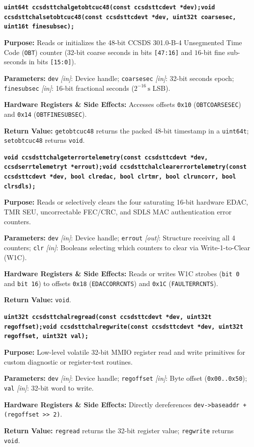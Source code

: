 \documentclass[10pt,a4paper]{article}
\renewcommand{\_}{\origunderscore\penalty0\hskip0pt\relax}
\newcommand{\apifunc}[5]{%
  \par\vspace{5pt}\noindent\colorbox{codebg}{%
    \parbox{\dimexpr\textwidth-2\fboxsep\relax}{%
      \vspace{3pt}\texttt{\bfseries\color{navy}#1}\vspace{3pt}%
    }%
  }\par\nopagebreak\vspace{2pt}%
  \noindent\textbf{Purpose:} #2\par\nopagebreak
  \noindent\textbf{Parameters:} #3\par\nopagebreak
  \noindent\textbf{Hardware Registers \& Side Effects:} #4\par\nopagebreak
  \noindent\textbf{Return Value:} #5\par\vspace{3pt}%
}
\numberwithin{table}{section}
\numberwithin{figure}{section}
\numberwithin{equation}{section}
\begin{document}
\apifunc{uint64\_t ccsds\_ttc\_hal\_get\_obt\_cuc48(const ccsds\_ttc\_dev\_t *dev);\newline void ccsds\_ttc\_hal\_set\_obt\_cuc48(const ccsds\_ttc\_dev\_t *dev, uint32\_t coarse\_sec, uint16\_t fine\_subsec);}%
{Reads or initializes the 48-bit CCSDS 301.0-B-4 Unsegmented Time Code (\texttt{OBT}) counter ($32$-bit coarse seconds in bits \texttt{[47:16]} and $16$-bit fine sub-seconds in bits \texttt{[15:0]}).}%
{\texttt{dev} \emph{[in]}: Device handle; \texttt{coarse\_sec} \emph{[in]}: 32-bit seconds epoch; \texttt{fine\_subsec} \emph{[in]}: 16-bit fractional seconds ($2^{-16}\,\text{s}$ LSB).}%
{Accesses offsets \texttt{0x10} (\texttt{OBT\_COARSE\_SEC}) and \texttt{0x14} (\texttt{OBT\_FINE\_SUBSEC}).}%
{\texttt{get\_obt\_cuc48} returns the packed 48-bit timestamp in a \texttt{uint64\_t}; \texttt{set\_obt\_cuc48} returns \texttt{void}.}

\apifunc{void ccsds\_ttc\_hal\_get\_error\_telemetry(const ccsds\_ttc\_dev\_t *dev, ccsds\_err\_telemetry\_t *err\_out);\newline void ccsds\_ttc\_hal\_clear\_error\_telemetry(const ccsds\_ttc\_dev\_t *dev, bool clr\_edac, bool clr\_tmr, bool clr\_uncorr, bool clr\_sdls);}%
{Reads or selectively clears the four saturating 16-bit hardware EDAC, TMR SEU, uncorrectable FEC/CRC, and SDLS MAC authentication error counters.}%
{\texttt{dev} \emph{[in]}: Device handle; \texttt{err\_out} \emph{[out]}: Structure receiving all 4 counters; \texttt{clr\_*} \emph{[in]}: Booleans selecting which counters to clear via Write-1-to-Clear (W1C).}%
{Reads or writes W1C strobes (\texttt{bit 0} and \texttt{bit 16}) to offsets \texttt{0x18} (\texttt{EDAC\_CORR\_CNTS}) and \texttt{0x1C} (\texttt{FAULT\_ERR\_CNTS}).}%
{\texttt{void}.}

\apifunc{uint32\_t ccsds\_ttc\_hal\_reg\_read(const ccsds\_ttc\_dev\_t *dev, uint32\_t reg\_offset);\newline void ccsds\_ttc\_hal\_reg\_write(const ccsds\_ttc\_dev\_t *dev, uint32\_t reg\_offset, uint32\_t val);}%
{Low-level volatile 32-bit MMIO register read and write primitives for custom diagnostic or register-test routines.}%
{\texttt{dev} \emph{[in]}: Device handle; \texttt{reg\_offset} \emph{[in]}: Byte offset (\texttt{0x00..0x50}); \texttt{val} \emph{[in]}: 32-bit word to write.}%
{Directly dereferences \texttt{dev->base\_addr + (reg\_offset >> 2)}.}%
{\texttt{reg\_read} returns the 32-bit register value; \texttt{reg\_write} returns \texttt{void}.}
\end{document}
